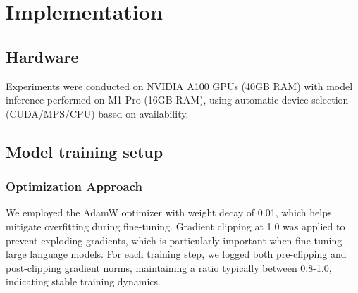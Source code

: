 \documentclass{article}
\begin{document}
\section*{Implementation}

\subsection*{Hardware}
Experiments were conducted on NVIDIA A100 GPUs (40GB RAM) with model inference performed on M1 Pro (16GB RAM), using automatic device selection (CUDA/MPS/CPU) based on availability.
\subsection*{Model training setup}
\subsubsection*{Optimization Approach}

We employed the AdamW optimizer with weight decay of 0.01, which helps mitigate overfitting during fine-tuning. Gradient clipping at 1.0 was applied to prevent exploding gradients, which is particularly important when fine-tuning large language models. For each training step, we logged both pre-clipping and post-clipping gradient norms, maintaining a ratio typically between 0.8-1.0, indicating stable training dynamics.
\end{document}
